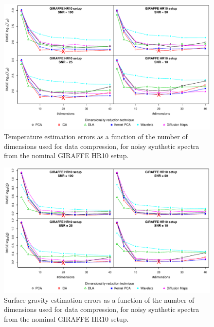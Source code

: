\documentclass[a4paper,fleqn,usenatbib]{mnras}
\begin{document}
{\begin{figure}
\centering\includegraphics[width=\textwidth]{flamesHR10_Teff_log_BestSVM_N-RMSE_test.pdf}
\caption{Temperature estimation errors as a function of the number of
  dimensions used for data compression, for noisy synthetic
  spectra from the nominal GIRAFFE HR10 setup.}
\label{fig:02}
\end{figure}

\begin{figure}
\centering\includegraphics[width=\textwidth]{flamesHR10_Logg_BestSVM_N-RMSE_test.pdf}
\caption{Surface gravity estimation errors as a function of the number of
  dimensions used for data compression, for noisy synthetic
  spectra from the nominal GIRAFFE HR10 setup.}
\label{fig:04}
\end{figure}

}
\end{document}
